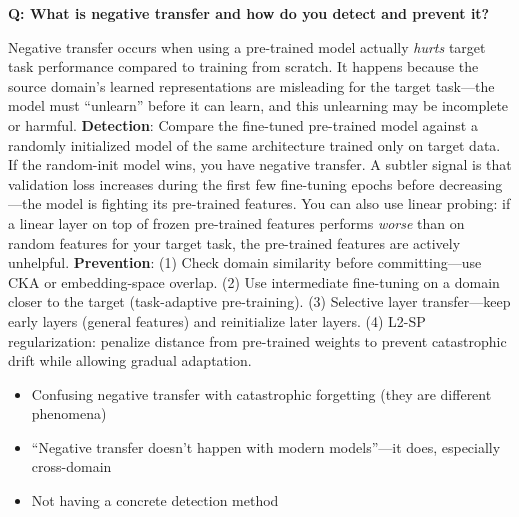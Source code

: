 \begin{interviewq}
\end{interviewq}

\begin{interviewq}
\textbf{Q: What is negative transfer and how do you detect and prevent it?}

 \quad {} \quad \badgefreq{\freqmed}

\stronganswer Negative transfer occurs when using a pre-trained model actually \textit{hurts} target task performance compared to training from scratch. It happens because the source domain's learned representations are misleading for the target task---the model must ``unlearn'' before it can learn, and this unlearning may be incomplete or harmful. \textbf{Detection}: Compare the fine-tuned pre-trained model against a randomly initialized model of the same architecture trained only on target data. If the random-init model wins, you have negative transfer. A subtler signal is that validation loss increases during the first few fine-tuning epochs before decreasing---the model is fighting its pre-trained features. You can also use linear probing: if a linear layer on top of frozen pre-trained features performs \textit{worse} than on random features for your target task, the pre-trained features are actively unhelpful. \textbf{Prevention}: (1) Check domain similarity before committing---use CKA or embedding-space overlap. (2) Use intermediate fine-tuning on a domain closer to the target (task-adaptive pre-training). (3) Selective layer transfer---keep early layers (general features) and reinitialize later layers. (4) L2-SP regularization: penalize distance from pre-trained weights to prevent catastrophic drift while allowing gradual adaptation.

\redflags
\begin{itemize}
    \item Confusing negative transfer with catastrophic forgetting (they are different phenomena)
    \item ``Negative transfer doesn't happen with modern models''---it does, especially cross-domain
    \item Not having a concrete detection method
\end{itemize}



\end{interviewq}
